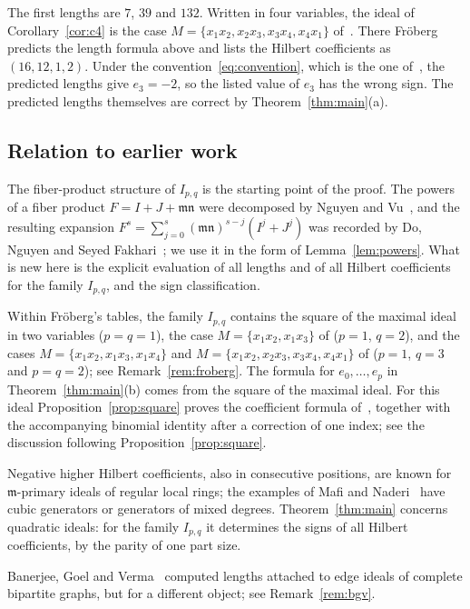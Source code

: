 \documentclass{amsart}
\theoremstyle{definition}
\theoremstyle{remark}
\numberwithin{equation}{section}
\newcommand{\mm}{\mathfrak{m}}
\begin{document}
The first lengths are $7$, $39$ and $132$. Written in four variables, the
ideal of Corollary~\ref{cor:c4} is the case
$M=\{x_1x_2,x_2x_3,x_3x_4,x_4x_1\}$ of~\cite[Conjecture~3.2]{Fr}. There Fr\"oberg predicts the length formula
above and lists the Hilbert coefficients as $(16,12,1,2)$. Under the
convention~\eqref{eq:convention}, which is the one of~\cite[p.~315]{Fr}, the
predicted lengths give $e_3=-2$, so the listed value of $e_3$ has the wrong
sign. The predicted lengths themselves are correct by
Theorem~\ref{thm:main}(a).

\subsection*{Relation to earlier work}
The fiber-product structure of $I_{p,q}$ is the starting point of the proof.
The powers of a fiber product $F=I+J+\mm\mathfrak n$ were decomposed by Nguyen
and Vu~\cite[Proposition~4.4]{NV}, and the resulting expansion
$F^s=\sum_{j=0}^{s}(\mm\mathfrak n)^{s-j}(I^j+J^j)$ was recorded by Do, Nguyen
and Seyed Fakhari~\cite[Lemmas~2.10 and~5.6]{DNSF}; we use it in the form of
Lemma~\ref{lem:powers}. What is new here is the explicit evaluation of all
lengths and of all Hilbert coefficients for the family $I_{p,q}$, and the sign
classification.

Within Fr\"oberg's tables, the family $I_{p,q}$ contains the square of the
maximal ideal in two variables ($p=q=1$), the case $M=\{x_1x_2,x_1x_3\}$ of
\cite[Theorem~3.1]{Fr} ($p=1$, $q=2$), and the cases $M=\{x_1x_2,x_1x_3,x_1x_4\}$
and $M=\{x_1x_2,x_2x_3,x_3x_4,x_4x_1\}$ of \cite[Conjecture~3.2]{Fr}
($p=1$, $q=3$ and $p=q=2$); see Remark~\ref{rem:froberg}. The formula for
$e_0,\dots,e_p$ in Theorem~\ref{thm:main}(b) comes from the square of the
maximal ideal. For this ideal Proposition~\ref{prop:square} proves the
coefficient formula of~\cite[Conjecture~3.1]{Fr}, together with the
accompanying binomial identity after a correction of one index; see the
discussion following Proposition~\ref{prop:square}.

Negative higher Hilbert coefficients, also in consecutive positions, are known
for $\mm$-primary ideals of regular local rings; the examples of Mafi and
Naderi~\cite[Examples~2.1 and~2.2]{MN} have cubic generators or generators of
mixed degrees. Theorem~\ref{thm:main} concerns quadratic ideals: for the family
$I_{p,q}$ it determines the signs of all Hilbert coefficients, by the parity of
one part size.

Banerjee, Goel and Verma~\cite[Theorem~3.3, Example~3.11]{BGV} computed lengths
attached to edge ideals of complete bipartite graphs, but for a different
object; see Remark~\ref{rem:bgv}.
\end{document}
